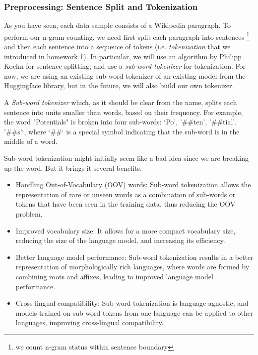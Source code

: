 \subsubsection{Preprocessing: Sentence Split and Tokenization}
As you have seen, each data sample consists of a Wikipedia paragraph. To perform our n-gram counting, we need first split each paragraph into sentences \footnote{we count n-gram status within sentence boundary} and then each sentence into a sequence of tokens (i.e. \textit{tokenization} that we introduced in homework 1).
In particular, we will use \href{https://aclanthology.org/W07-0733/}{an algorithm} by Philipp Koehn for sentence splitting; and use a \textit{sub-word tokenizer} for tokenization. For now, we are using an existing sub-word tokenizer of an existing model from the Huggingface library, but in the future, we will also build our own tokenizer.

A \textit{Sub-word tokenizer} which, as it should be clear from the name, splits each sentence into units smaller than words, based on their frequency. For example, the word "Potentials" is broken into four sub-words: `Po', '\#\#ten', '\#\#tial', '\#\#s'`, where `\#\#` is a special symbol indicating that the sub-word is in the middle of a word.


Sub-word tokenization might initially seem like a bad idea since we are breaking up the word. But it brings it several benefits.
\begin{itemize}
    \item Handling Out-of-Vocabulary (OOV) words: Sub-word tokenization allows the representation of rare or unseen words as a combination of sub-words or tokens that have been seen in the training data, thus reducing the OOV problem.
    \item Improved vocabulary size: It allows for a more compact vocabulary size, reducing the size of the language model, and increasing its efficiency.
    \item Better language model performance: Sub-word tokenization results in a better representation of morphologically rich languages, where words are formed by combining roots and affixes, leading to improved language model performance.
    \item Cross-lingual compatibility: Sub-word tokenization is language-agnostic, and models trained on sub-word tokens from one language can be applied to other languages, improving cross-lingual compatibility.
    
\end{itemize}

